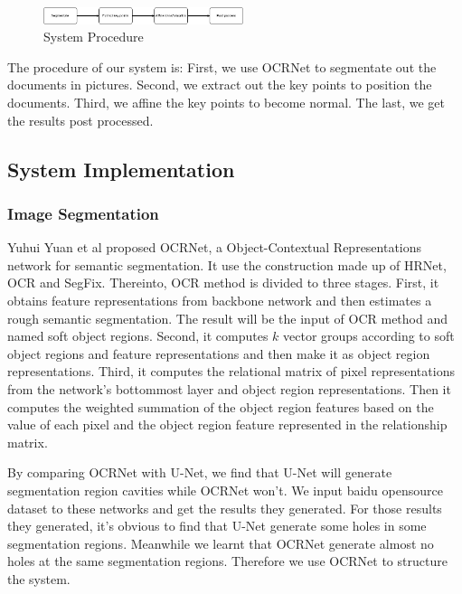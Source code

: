 \documentclass[10pt, conference, compsocconf]{IEEEtran}
\begin{document}

		\begin{figure}[!h]
			\centering
			\includegraphics[width=2.3in]{./Assets/FlowChart.png}
			\caption{System Procedure}
		\end{figure}


		The procedure of our system is: 
		First, we use OCRNet to segmentate out the documents in pictures. 
		Second, we extract out the key points to position the documents. 
		Third, we affine the key points to become normal. 
		The last, we get the results post processed. 

		\subsection{System Implementation}

			\subsubsection{Image Segmentation}


			Yuhui Yuan et al proposed OCRNet, a Object-Contextual Representations network for semantic segmentation. 
			It use the construction made up of HRNet, OCR and SegFix. 
			Thereinto, OCR method is divided to three stages. 
			First, it obtains feature representations from backbone network and then estimates a rough semantic segmentation. 
			The result will be the input of OCR method and named soft object regions.
			Second, it computes $k$ vector groups according to soft object regions and feature representations and then make it as object region representations. 
			Third, it computes the relational matrix of pixel representations from the network's bottommost layer and object region representations. 
			Then it computes the weighted summation of the object region features based on the value of each pixel and the object region feature represented in the relationship matrix. 

			By comparing OCRNet with U-Net, we find that U-Net will generate segmentation region cavities while OCRNet won't. 
			We input baidu opensource dataset to these networks and get the results they generated. 
			For those results they generated, it's obvious to find that U-Net generate some holes in some segmentation regions. 
			Meanwhile we learnt that OCRNet generate almost no holes at the same segmentation regions. 
			Therefore we use OCRNet to structure the system. 
			
\end{document}
